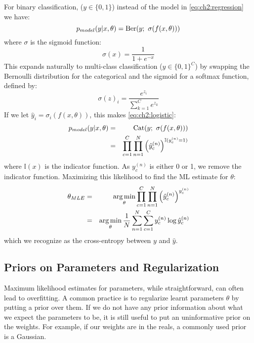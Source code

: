 For binary classification, ($y \in \{0, 1\}$) instead of the model in
\eqref{eq:ch2:regression} we have: 
\begin{equation} \label{eq:ch2:logistic}
  p_{model}(y|x, \theta) = \mathrm{Ber}(y;\ \sigma(f(x, \theta)))
\end{equation}
where $\sigma$ is the sigmoid function:
\begin{equation}\label{eq:ch2:sigmoid}
  \sigma(x) = \frac{1}{1+e^{-x}}
\end{equation}
This expands naturally to multi-class classification ($y \in \{0, 1\}^C$) by
swapping the Bernoulli distribution for the categorical and the sigmoid for a
softmax function, defined by:
\begin{equation}
  \sigma(z)_i = \frac{e^{z_i}}{\sum_{k=1}^C e^{z_k}}
\end{equation}
If we let $\hat{y}_i = \sigma_i(f(x, \theta))$, this makes \eqref{eq:ch2:logistic}:
\begin{eqnarray}\label{eq:ch2:classification}
  p_{model}(y|x, \theta) &=& \mathrm{Cat}(y;\ \sigma(f(x, \theta))) \\
                         &=& \prod_{c=1}^C \prod_{n=1}^N \left(\hat{y}_c^{(n)}\right)^{\mathbb{I}(y^{(n)}_c = 1)}
\end{eqnarray}
where $\mathbb{I}(x)$ is the indicator function. As $y^{(n)}_c$ is either 0 or
1, we remove the indicator function. Maximizing this likelihood to
find the ML estimate for $\theta$:
\begin{eqnarray}
  \theta_{MLE} &=& \operatorname*{arg\,min}_\theta \prod_{c=1}^C \prod_{n=1}^N \left(\hat{y}_c^{(n)}\right)^{y^{(n)}_c} \\
               &=& \operatorname*{arg\,min}_\theta \frac{1}{N}\sum_{n=1}^N \sum_{c=1}^C y^{(n)}_c\log \hat{y}_c^{(n)} \label{eq:ch2:mle_class}
\end{eqnarray}
which we recognize as the cross-entropy between $y$ and $\hat{y}$.

\subsection{Priors on Parameters and Regularization}
  Maximum likelihood estimates for parameters, while straightforward, can often
  lead to overfitting. A common practice is to regularize learnt parameters
  $\theta$ by putting a prior over them. If we do not have any prior information
  about what we expect the parameters to be, it is still useful to put an
  uninformative prior on the weights. For example, if our weights are in the
  reals, a commonly used prior is a Gaussian.

